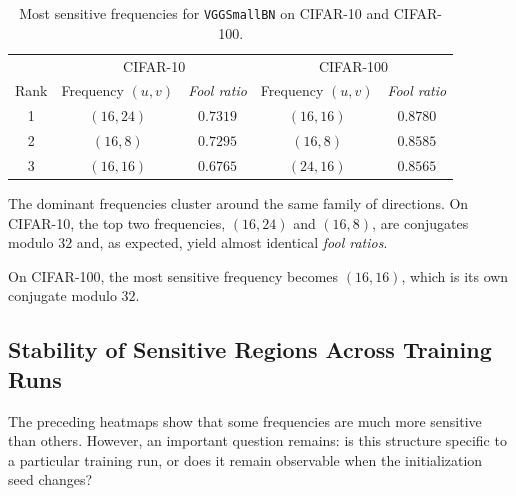 \begin{table}[H]
    \centering
    \begin{tabular}{c|cc|cc}
        & \multicolumn{2}{c|}{CIFAR-10} & \multicolumn{2}{c}{CIFAR-100} \\
        Rank & Frequency $(u,v)$ & \textit{Fool ratio} & Frequency $(u,v)$ & \textit{Fool ratio} \\
        \hline
        1 & $(16,24)$ & $0.7319$ & $(16,16)$ & $0.8780$ \\
        2 & $(16,8)$  & $0.7295$ & $(16,8)$  & $0.8585$ \\
        3 & $(16,16)$ & $0.6765$ & $(24,16)$ & $0.8565$ \\
    \end{tabular}
    \caption{Most sensitive frequencies for \texttt{VGGSmallBN} on CIFAR-10 and CIFAR-100.}
    \label{tab:frequences_plus_sensibles}
\end{table}

The dominant frequencies cluster around the same family of directions. On CIFAR-10, the top two frequencies,
$(16,24)$ and $(16,8)$, are conjugates modulo $32$ and, as expected, yield almost identical \textit{fool ratios}.


On CIFAR-100, the most sensitive frequency becomes $(16,16)$, which is its own conjugate modulo
$32$.

\subsection{Stability of Sensitive Regions Across Training Runs}
\label{subsec:stabilite_multi_seeds}

The preceding heatmaps show that some frequencies are much more sensitive than
others. However, an important question remains: is this structure specific to a
particular training run, or does it remain observable when the initialization seed
changes?

